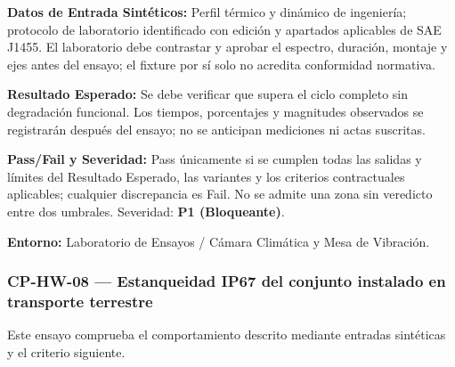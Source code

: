\par\noindent \textbf{Datos de Entrada Sintéticos:} Perfil térmico y dinámico de ingeniería; protocolo de laboratorio identificado con edición y apartados aplicables de SAE J1455. El laboratorio debe contrastar y aprobar el espectro, duración, montaje y ejes antes del ensayo; el fixture por sí solo no acredita conformidad normativa.\par
\par\noindent \textbf{Resultado Esperado:} Se debe verificar que supera el ciclo completo sin degradación funcional. Los tiempos, porcentajes y magnitudes observados se registrarán después del ensayo; no se anticipan mediciones ni actas suscritas.\par
\par\noindent \textbf{Pass/Fail y Severidad:} Pass únicamente si se cumplen todas las salidas y límites del Resultado Esperado, las variantes y los criterios contractuales aplicables; cualquier discrepancia es Fail. No se admite una zona sin veredicto entre dos umbrales. Severidad: \textbf{P1 (Bloqueante)}.\par
\par\noindent \textbf{Entorno:} Laboratorio de Ensayos / Cámara Climática y Mesa de Vibración.\par


\subsubsection*{CP-HW-08 — Estanqueidad IP67 del conjunto instalado en transporte terrestre}\label{sec:9-cp-hw-08}
Este ensayo comprueba el comportamiento descrito mediante entradas sintéticas y el criterio siguiente.

